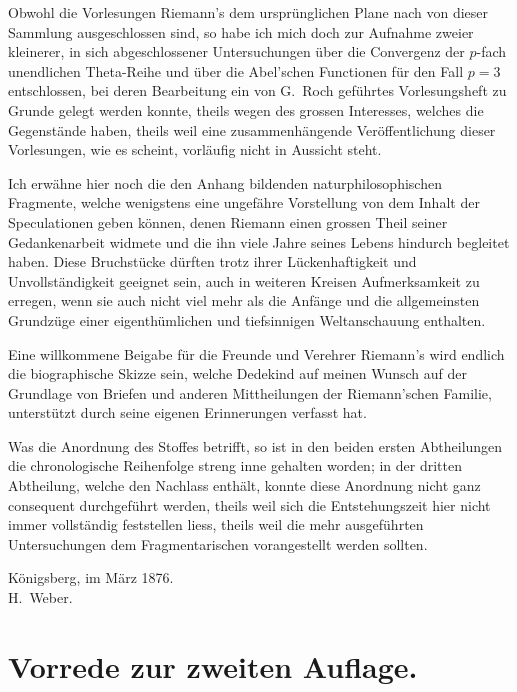 \documentclass[12pt,a4paper]{book}
\theoremstyle{definition}
\theoremstyle{remark}
\begin{document}
Obwohl die Vorlesungen Riemann's dem urspr\"unglichen Plane nach von dieser Sammlung ausgeschlossen sind, so habe ich mich doch zur Aufnahme zweier kleinerer, in sich abgeschlossener Untersuchungen \"uber die Convergenz der $p$-fach unendlichen Theta-Reihe und \"uber die Abel'schen Functionen f\"ur den Fall $p = 3$ entschlossen, bei deren Bearbeitung ein von G.\ Roch gef\"uhrtes Vorlesungsheft zu Grunde gelegt werden konnte, theils wegen des grossen Interesses, welches die Gegenst\"ande haben, theils weil eine zusammenh\"angende Ver\"offentlichung dieser Vorlesungen, wie es scheint, vorl\"aufig nicht in Aussicht steht.

Ich erw\"ahne hier noch die den Anhang bildenden naturphilosophischen Fragmente, welche wenigstens eine ungef\"ahre Vorstellung von dem Inhalt der Speculationen geben k\"onnen, denen Riemann einen grossen Theil seiner Gedankenarbeit widmete und die ihn viele Jahre seines Lebens hindurch begleitet haben. Diese Bruchst\"ucke d\"urften trotz ihrer L\"uckenhaftigkeit und Unvollst\"andigkeit geeignet sein, auch in weiteren Kreisen Aufmerksamkeit zu erregen, wenn sie auch nicht viel mehr als die Anf\"ange und die allgemeinsten Grundz\"uge einer eigenth\"umlichen und tiefsinnigen Weltanschauung enthalten.

Eine willkommene Beigabe f\"ur die Freunde und Verehrer Riemann's wird endlich die biographische Skizze sein, welche Dedekind auf meinen Wunsch auf der Grundlage von Briefen und anderen Mittheilungen der Riemann'schen Familie, unterst\"utzt durch seine eigenen Erinnerungen verfasst hat.

Was die Anordnung des Stoffes betrifft, so ist in den beiden ersten Abtheilungen die chronologische Reihenfolge streng inne gehalten worden; in der dritten Abtheilung, welche den Nachlass enth\"alt, konnte diese Anordnung nicht ganz consequent durchgef\"uhrt werden, theils weil sich die Entstehungszeit hier nicht immer vollst\"andig feststellen liess, theils weil die mehr ausgef\"uhrten Untersuchungen dem Fragmentarischen vorangestellt werden sollten.

\begin{flushright}
K\"onigsberg, im M\"arz 1876.\\
H.\ Weber.
\end{flushright}

\clearpage

\section*{Vorrede zur zweiten Auflage.}
\end{document}

